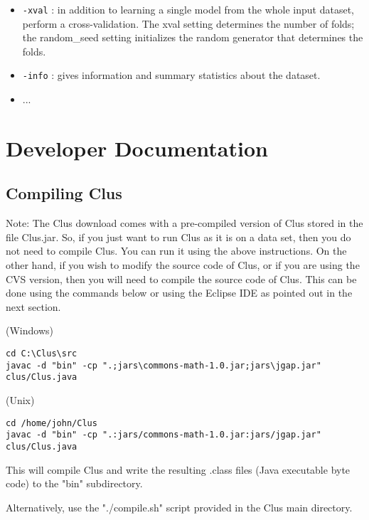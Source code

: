 \begin{itemize}
\item {\tt -xval} : in addition to learning a single model from the whole input dataset, perform a cross-validation.  The xval setting determines the number of folds; the random\_seed setting initializes the random generator that determines the folds.
\item {\tt -info} : gives information and summary statistics about the dataset.
\item ...
\end{itemize}

\chapter{Developer Documentation}

\section{Compiling Clus}

Note: The Clus download comes with a pre-compiled version of Clus 
stored in the file Clus.jar. So, if you just want to run Clus as it is on a 
data set, then you do not need to compile Clus. You can run it using the
above instructions. On the other hand, if you wish to modify the source 
code of Clus, or if you are using the CVS version, then you will need to 
compile the source code of Clus. This can be done using the commands
below or using the Eclipse IDE as pointed out in the next section.

(Windows)

\begin{small}
\begin{verbatim}
cd C:\Clus\src
javac -d "bin" -cp ".;jars\commons-math-1.0.jar;jars\jgap.jar" clus/Clus.java
\end{verbatim}
\end{small}

(Unix)

\begin{small}
\begin{verbatim}
cd /home/john/Clus
javac -d "bin" -cp ".:jars/commons-math-1.0.jar:jars/jgap.jar" clus/Clus.java
\end{verbatim}
\end{small}

This will compile Clus and write the resulting .class files (Java executable 
byte code) to the "bin" subdirectory.

Alternatively, use the "./compile.sh" script provided in the Clus main directory.

